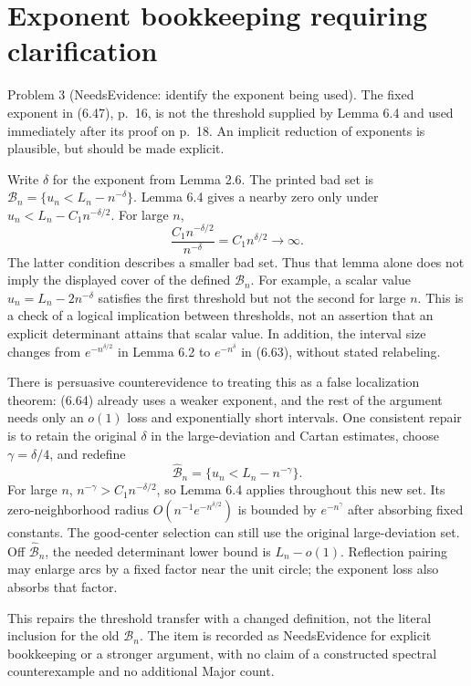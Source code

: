 \documentclass[10pt]{article}
\begin{document}
\section*{Exponent bookkeeping requiring clarification}
Problem 3 (NeedsEvidence: identify the exponent being used).  The fixed exponent in (6.47), p. 16, is not the threshold supplied by Lemma 6.4 and used immediately after its proof on p. 18. An implicit reduction of exponents is plausible, but should be made explicit.\par
Write \(\delta\) for the exponent from Lemma 2.6. The printed bad set is \(\mathcal B_n=\{u_n<L_n-n^{-\delta}\}\). Lemma 6.4 gives a nearby zero only under \(u_n<L_n-C_1n^{-\delta/2}\). For large \(n\), \[\frac{C_1n^{-\delta/2}}{n^{-\delta}}
 =C_1n^{\delta/2}\longrightarrow\infty .\] The latter condition describes a smaller bad set. Thus that lemma alone does not imply the displayed cover of the defined \(\mathcal B_n\). For example, a scalar value \(u_n=L_n-2n^{-\delta}\) satisfies the first threshold but not the second for large \(n\). This is a check of a logical implication between thresholds, not an assertion that an explicit determinant attains that scalar value. In addition, the interval size changes from \(e^{-n^{\delta/2}}\) in Lemma 6.2 to \(e^{-n^\delta}\) in (6.63), without stated relabeling.\par
There is persuasive counterevidence to treating this as a false localization theorem: (6.64) already uses a weaker exponent, and the rest of the argument needs only an \(o(1)\) loss and exponentially short intervals. One consistent repair is to retain the original \(\delta\) in the large-deviation and Cartan estimates, choose \(\gamma=\delta/4\), and redefine \[\widehat{\mathcal B}_n=\{u_n<L_n-n^{-\gamma}\}.\] For large \(n\), \(n^{-\gamma}>C_1n^{-\delta/2}\), so Lemma 6.4 applies throughout this new set. Its zero-neighborhood radius \(O(n^{-1}e^{-n^{\delta/2}})\) is bounded by \(e^{-n^\gamma}\) after absorbing fixed constants. The good-center selection can still use the original large-deviation set. Off \(\widehat{\mathcal B}_n\), the needed determinant lower bound is \(L_n-o(1)\). Reflection pairing may enlarge arcs by a fixed factor near the unit circle; the exponent loss also absorbs that factor.\par
This repairs the threshold transfer with a changed definition, not the literal inclusion for the old \(\mathcal B_n\). The item is recorded as NeedsEvidence for explicit bookkeeping or a stronger argument, with no claim of a constructed spectral counterexample and no additional Major count.\par
\end{document}
